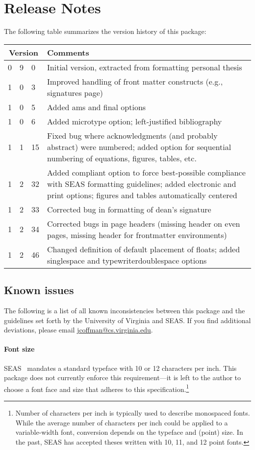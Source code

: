 \documentclass[10pt]{article}
\newcommand{\option}[1]{#1}
\begin{document}
\section{Release Notes}\label{section:release notes}
The following table summarizes the version history of this package:
\begin{longtable}{r@{.}r@{.}l p{.8\linewidth}}
  \multicolumn{3}{c}{Version} & Comments\\
  \midrule
  0	& 9	& 0	& Initial version, extracted from formatting personal thesis\\[2ex] %
  1	& 0	& 3	& Improved handling of front matter constructs (e.g., signatures page)\\
  1	& 0	& 5	& Added \option{ams} and \option{final} options\\
  1	& 0	& 6	& Added \option{microtype} option; left-justified bibliography\\
  1	& 1	& 15	& Fixed bug where acknowledgments (and probably abstract) were numbered; added option for sequential numbering of equations, figures, tables, etc.\\
  1	& 2	& 32 	& Added \option{compliant} option to force best-possible compliance with \gls{SEAS} formatting guidelines; added \option{electronic} and \option{print} options; figures and tables automatically centered\\
  1	& 2	& 33	& Corrected bug in formatting of dean's signature\\
  1	& 2	& 34	& Corrected bugs in page headers (missing header on even pages, missing header for frontmatter environments)\\
  1     & 2     & 46    & Changed definition of default placement of floats; added \option{singlespace} and \option{typewriterdoublespace} options
\end{longtable}

\subsection*{Known issues}
The following is a list of all known inconsistencies between this package and the guidelines set forth by the University of Virginia and \gls{SEAS}.
If you find additional deviations, please email \url{jcoffman@cs.virginia.edu}.

\paragraph{Font size}
\Gls{SEAS}~\cite{seas:instructions} mandates a standard typeface with 10 or 12 characters per inch.
This package does not currently enforce this requirement---it is left to the author to choose a font face and size that adheres to this specification.\footnote{
  Number of characters per inch is typically used to describe monospaced fonts.
  While the average number of characters per inch could be applied to a variable-width font, conversion depends on the typeface and (point) size.
  In the past, \Gls{SEAS} has accepted theses written with 10, 11, and 12 point fonts.
}
\end{document}
